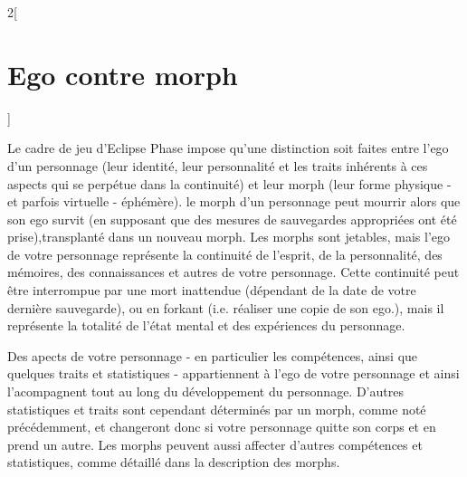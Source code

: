 \documentclass[a4paper,9pt]{article}
\begin{document}
\begin{multicols}{2}[\section{Ego contre morph} \label{sec:ego-vs.-morph-1}]

Le cadre de jeu d'Eclipse Phase impose qu'une distinction soit faites entre
l'ego d'un personnage (leur identité, leur personnalité et les traits inhérents
à ces aspects qui se perpétue dans la continuité) et leur morph (leur forme
physique - et parfois virtuelle - éphémère). le morph d'un personnage peut
mourrir alors que son ego survit (en supposant que des mesures de sauvegardes
appropriées ont été prise),transplanté dans un nouveau morph. Les morphs sont
jetables, mais l'ego de votre personnage représente la continuité de l'esprit,
de la personnalité, des mémoires, des connaissances et autres de votre
personnage. Cette continuité peut être interrompue par une mort inattendue
(dépendant de la date de votre dernière sauvegarde), ou en forkant (i.e.
réaliser une copie de son ego.), mais il représente la totalité de l'état
mental et des expériences du personnage. 

Des apects de votre personnage - en particulier les compétences, ainsi que
quelques traits et statistiques - appartiennent à l'ego de votre personnage et
ainsi l'acompagnent tout au long du développement du personnage. D'autres
statistiques et traits sont cependant déterminés par un morph, comme noté
précédemment, et changeront donc si votre personnage quitte son corps et en
prend un autre. Les morphs peuvent aussi affecter d'autres compétences et
statistiques, comme détaillé dans la description des morphs. 

\end{multicols}
\end{document}
